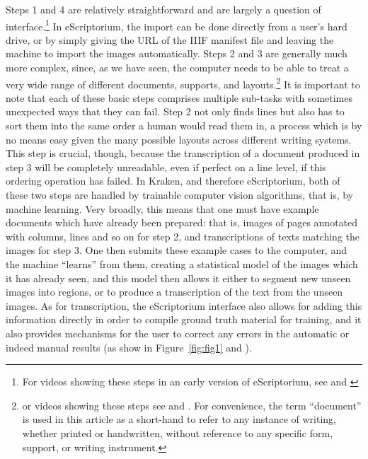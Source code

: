 Steps 1 and 4 are relatively straightforward and are largely a question of
interface.\footnote{For videos showing these steps in an early version of
eScriptorium, see \cite{stokes2020escriptorium} and \cite[n. 1 and
5]{stokes2020videos}} In eScriptorium, the import can be done directly from a
user’s hard drive, or by simply giving the URL of the IIIF manifest file and
leaving the machine to import the images automatically. Steps 2 and 3 are
generally much more complex, since, as we have seen, the computer needs to be
able to treat a very wide range of different documents, supports, and
layouts.\footnote{or videos showing these steps see
\cite{stokes2020escriptorium} and \cite[n. 2-4 and 6]{stokes2020videos}. For
convenience, the term “document” is used in this article as a short-hand to
refer to any instance of writing, whether printed or handwritten, without
reference to any specific form, support, or writing instrument.} It is
important to note that each of these basic steps comprises multiple sub-tasks
with sometimes unexpected ways that they can fail. Step 2 not only finds lines
but also has to sort them into the same order a human would read them in, a
process which is by no means easy given the many possible layouts across
different writing systems. This step is crucial, though, because the
transcription of a document produced in step 3 will be completely unreadable,
even if perfect on a line level, if this ordering operation has failed. In
Kraken, and therefore eScriptorium, both of these two steps are handled by
trainable computer vision algorithms, that is, by machine learning. Very
broadly, this means that one must have example documents which have already
been prepared: that is, images of pages annotated with columns, lines and so on
for step 2, and transcriptions of texts matching the images for step 3. One
then submits these example cases to the computer, and the machine “learns” from
them, creating a statistical model of the images which it has already seen, and
this model then allows it either to segment new unseen images into regions, or
to produce a transcription of the text from the unseen images. As for
transcription, the eScriptorium interface also allows for adding this
information directly in order to compile ground truth material for training,
and it also provides mechanisms for the user to correct any errors in the
automatic or indeed manual results (as show in Figure~\ref{fig:fig1} and \cite[n.
3]{stokes2020videos}).

